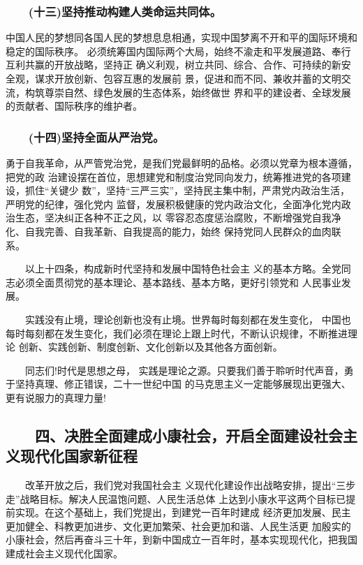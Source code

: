 \documentclass[11pt]{ctexart}
\begin{document}
{{{{\subsubsection{　　(十三)坚持推动构建人类命运共同体。}
\label{sec:org1964edf}

中国人民的梦想同各国人民的梦想息息相通，实现中国梦离不开和平的国际环境和稳定的国际秩序。
必须统筹国内国际两个大局，始终不渝走和平发展道路、奉行互利共赢的开放战略，坚持正
确义利观，树立共同、综合、合作、可持续的新安全观，谋求开放创新、包容互惠的发展前
景，促进和而不同、兼收并蓄的文明交流，构筑尊崇自然、绿色发展的生态体系，始终做世
界和平的建设者、全球发展的贡献者、国际秩序的维护者。

\subsubsection{　　(十四)坚持全面从严治党。}
\label{sec:orgddbed0e}

勇于自我革命，从严管党治党，是我们党最鲜明的品格。必须以党章为根本遵循，把党的政
治建设摆在首位，思想建党和制度治党同向发力，统筹推进党的各项建设，抓住“关键少
数”，坚持“三严三实”，坚持民主集中制，严肃党内政治生活，严明党的纪律，强化党内
监督，发展积极健康的党内政治文化，全面净化党内政治生态，坚决纠正各种不正之风，以
零容忍态度惩治腐败，不断增强党自我净化、自我完善、自我革新、自我提高的能力，始终
保持党同人民群众的血肉联系。

　　以上十四条，构成新时代坚持和发展中国特色社会主
义的基本方略。全党同志必须全面贯彻党的基本理论、基本路线、基本方略，更好引领党和
人民事业发展。

　　实践没有止境，理论创新也没有止境。世界每时每刻都在发生变化，
中国也每时每刻都在发生变化，我们必须在理论上跟上时代，不断认识规律，不断推进理论
创新、实践创新、制度创新、文化创新以及其他各方面创新。

　　同志们!时代是思想之母，
实践是理论之源。只要我们善于聆听时代声音，勇于坚持真理、修正错误，二十一世纪中国
的马克思主义一定能够展现出更强大、更有说服力的真理力量!

\subsection{　　四、决胜全面建成小康社会，开启全面建设社会主义现代化国家新征程}
\label{sec:org3349e32}

　　改革开放之后，我们党对我国社会主
义现代化建设作出战略安排，提出“三步走”战略目标。解决人民温饱问题、人民生活总体
上达到小康水平这两个目标已提前实现。在这个基础上，我们党提出，到建党一百年时建成
经济更加发展、民主更加健全、科教更加进步、文化更加繁荣、社会更加和谐、人民生活更
加殷实的小康社会，然后再奋斗三十年，到新中国成立一百年时，基本实现现代化，把我国
建成社会主义现代化国家。

}}}}
\end{document}
